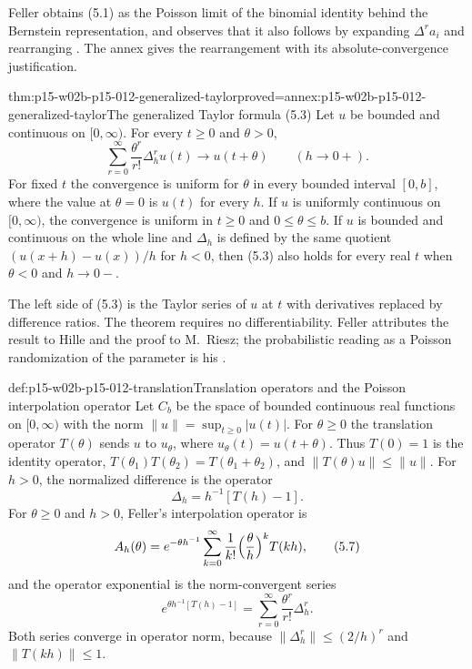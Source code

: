 Feller obtains (5.1) as the Poisson limit of the binomial identity behind the
Bernstein representation, and observes that it also follows by expanding
\(\Delta^r a_i\) and rearranging \cite[vol.~II, VII.5, p.~230 and n.~6]{Feller1971ProbabilityII}.
The annex gives the rearrangement with its absolute-convergence justification.

\begin{hbtheorem}{thm:p15-w02b-p15-012-generalized-taylor}{proved=annex:p15-w02b-p15-012-generalized-taylor}{The generalized Taylor formula (5.3)}
Let \(u\) be bounded and continuous on \([0,\infty)\). For every
\(t\geq0\) and \(\theta>0\),
\[
 \sum_{r=0}^\infty\frac{\theta^r}{r!}\Delta_h^r u(t)\longrightarrow u(t+\theta)
 \qquad(h\to0+).
 \tag{5.3}
\]
For fixed \(t\) the convergence is uniform for \(\theta\) in every bounded
interval \([0,b]\), where the value at \(\theta=0\) is \(u(t)\) for every
\(h\). If \(u\) is uniformly continuous on \([0,\infty)\), the convergence is
uniform in \(t\geq0\) and \(0\leq\theta\leq b\).
If \(u\) is bounded and continuous on the whole line and \(\Delta_h\) is
defined by the same quotient \((u(x+h)-u(x))/h\) for \(h<0\), then (5.3)
also holds for every real \(t\) when \(\theta<0\) and \(h\to0-\).
\end{hbtheorem}

The left side of (5.3) is the Taylor series of \(u\) at \(t\) with derivatives
replaced by difference ratios. The theorem requires no differentiability.
Feller attributes the result to Hille and the proof to M.~Riesz; the
probabilistic reading as a Poisson randomization of the parameter is his
\cite[vol.~II, VII.5, p.~231 and nn.~7--8]{Feller1971ProbabilityII}.

\begin{hbdefinition}{def:p15-w02b-p15-012-translation}{Translation operators and the Poisson interpolation operator}
Let \(C_b\) be the space of bounded continuous real functions on
\([0,\infty)\) with the norm \(\|u\|=\sup_{t\geq0}|u(t)|\). For
\(\theta\geq0\) the translation operator \(T(\theta)\) sends \(u\) to
\(u_\theta\), where \(u_\theta(t)=u(t+\theta)\). Thus \(T(0)=1\) is the
identity operator, \(T(\theta_1)T(\theta_2)=T(\theta_1+\theta_2)\), and
\(\|T(\theta)u\|\leq\|u\|\). For \(h>0\), the normalized difference is the
operator
\[
 \Delta_h=h^{-1}[T(h)-1].
 \tag{5.5}
\]
For \(\theta\geq0\) and \(h>0\), Feller's interpolation operator is
\[
 A_h(\theta)=e^{-\theta h^{-1}}\sum_{k=0}^\infty
               \frac1{k!}\Bigl(\frac\theta h\Bigr)^kT(kh),
 \tag{5.7}
\]
and the operator exponential is the norm-convergent series
\[
 e^{\theta h^{-1}[T(h)-1]}=\sum_{r=0}^\infty\frac{\theta^r}{r!}\Delta_h^r .
\]
Both series converge in operator norm, because
\(\|\Delta_h^r\|\leq(2/h)^r\) and \(\|T(kh)\|\leq1\).
\end{hbdefinition}

